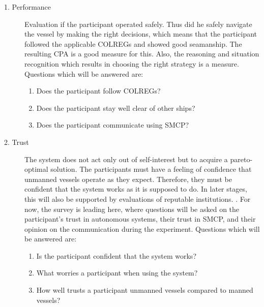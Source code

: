 \begin{description}
	\item [1. Performance] \performance Evaluation if the participant operated safely. Thus did he safely navigate the vessel by making the right decisions, which means that the participant followed the applicable \ac{COLREGs} and showed good seamanship. The resulting \acf{CPA} is a good measure for this. Also, the reasoning and situation recognition which results in choosing the right strategy is a measure. Questions which will be answered are:
	\begin{spacing}{1}
	\begin{enumerate}
		\item Does the participant follow \ac{COLREGs}?
		\item Does the participant stay well clear of other ships?
		\item Does the participant communicate using \ac{SMCP}?
	\end{enumerate}
	\end{spacing}
	
	\item [2. Trust] \trust The system does not act only out of self-interest but to acquire a pareto-optimal solution. The participants must have a feeling of confidence that unmanned vessels operate as they expect. Therefore, they must be confident that the system works as it is supposed to do. In later stages, this will also be supported by evaluations of reputable institutions. \cite{Ozawa2013}.
	For now, the survey is leading here, where questions will be asked on the participant's trust in autonomous systems, their trust in SMCP, and their opinion on the communication during the experiment. Questions which will be answered are:
	\begin{spacing}{1}
	\begin{enumerate}
		\item Is the participant confident that the system works?
		\item What worries a participant when using the system?
		\item How well trusts a participant unmanned vessels compared to manned vessels?
	\end{enumerate}
	\end{spacing}


\end{description}
